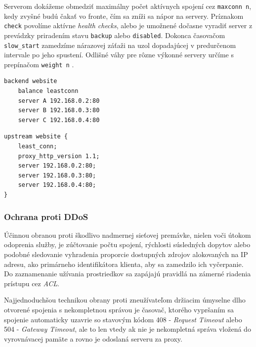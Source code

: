 \documentclass[12pt, a4paper]{article}
\begin{document}
Serverom dokážeme obmedziť maximálny počet aktívnych spojení cez \verb|maxconn n|, kedy zvyšné budú čakať
vo fronte, čím sa zníži sa nápor na servery. Príznakom \verb|check| povolíme
aktívne \emph{health checks}, alebo je umožnené dočasne vyradiť server z prevádzky priradením 
stavu \verb|backup| alebo \verb|disabled|. Dokonca časovačom \verb|slow_start| zamedzíme nárazovej záťaži
na uzol dopadajúcej v predurčenom intervale po jeho spustení. Odlišné váhy pre rôzne výkonné servery 
určíme s prepínačom \verb|weight n| \cite{haproxy-docs}.

\noindent\begin{minipage}{.48\textwidth}
\begin{lstlisting}[caption=HAProxy:  vyvažovanie záťaže najmenej spojení na trojicu HTTP serverov]
backend website
    balance leastconn
    server A 192.168.0.2:80
    server B 192.168.0.3:80
    server C 192.168.0.4:80
\end{lstlisting}
\end{minipage}\hfill
\begin{minipage}{.48\textwidth}
\begin{lstlisting}[caption=NGINX: vyvažovanie záťaže najmenej spojení na trojicu HTTP serverov]
upstream website {
    least_conn;
    proxy_http_version 1.1;
    server 192.168.0.2:80;
    server 192.168.0.3:80;
    server 192.168.0.4:80;
}
\end{lstlisting}
\end{minipage}

\subsubsection{Ochrana proti DDoS}
Účinnou obranou proti škodlivo nadmernej sieťovej premávke, nielen voči útokom odoprenia služby, je 
zúčtovanie počtu spojení, rýchlosti súsledných dopytov alebo podobné sledovanie vyhradenia proporcie
dostupných zdrojov alokovaných na IP adresu, ako primárneho identifikátora klienta, aby
sa zamedzilo ich vyčerpanie. Do zaznamenanie užívania prostriedkov sa zapájajú pravidlá na zámerné
riadenia prístupu cez \emph{ACL}. 

Najjednoduchšou technikou obrany proti zneužívateľom držiacim úmyselne  dlho otvorené spojenia s 
nekompletnou správou je časovač, ktorého vypršaním sa spojenie automaticky uzavrie so stavovým kódom 408 - 
\emph{Request Timeout} alebo 504 - \emph{Gateway Timeout}, ale to len vtedy ak nie je nekompletná správa 
vložená do vyrovnávacej pamäte a rovno je odoslaná serveru za proxy.
\end{document}
